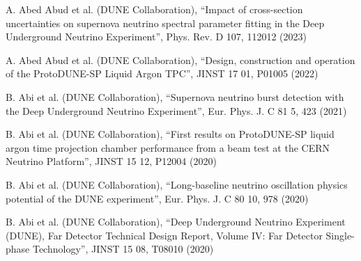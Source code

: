 \begin{list2}
\item A. Abed Abud et al. (DUNE Collaboration), ``Impact of cross-section uncertainties on supernova neutrino spectral parameter fitting in the Deep Underground Neutrino Experiment'', Phys. Rev. D 107, 112012 (2023)
\item A. Abed Abud et al. (DUNE Collaboration), ``Design, construction and operation of the ProtoDUNE-SP Liquid Argon TPC'', JINST 17 01, P01005 (2022)
\item B. Abi et al. (DUNE Collaboration), ``Supernova neutrino burst detection with the Deep Underground Neutrino Experiment'', Eur. Phys. J. C 81 5, 423 (2021)
\item B. Abi et al. (DUNE Collaboration), ``First results on ProtoDUNE-SP liquid argon time projection chamber performance from a beam test at the CERN Neutrino Platform'', JINST 15 12, P12004 (2020)
\item B. Abi et al. (DUNE Collaboration), ``Long-baseline neutrino oscillation physics potential of the DUNE experiment'', Eur. Phys. J. C 80 10, 978 (2020)
\item B. Abi et al. (DUNE Collaboration), ``Deep Underground Neutrino Experiment (DUNE), Far Detector Technical Design Report, Volume IV: Far Detector Single-phase Technology'', JINST 15 08, T08010 (2020)
\end{list2}

